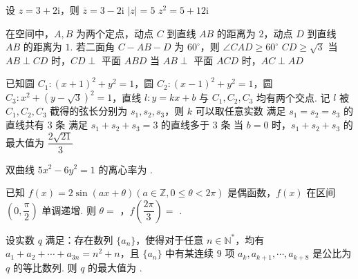 \documentclass[a4paper,11pt]{report}
\begin{document}
\begin{examquestions}[start=9]
\item 设 $z=3+2\mathrm{i}$，则
\fourchoices
{$\overline z=3-2\mathrm{i}$}
{$|z|=5$}
{$z^2=5+12\mathrm{i}$}
{}

\item 在空间中，$A,B$ 为两个定点，动点 $C$ 到直线 $AB$ 的距离为 $2$，动点 $D$ 到直线 $AB$ 的距离为 $1$. 若二面角 $C-AB-D$ 为 $60^\circ$，则
\twochoices
{$\angle CAD\geq 60^\circ$}
{$CD\geq \sqrt3$}
{当 $AB\perp CD$ 时，$CD\perp$ 平面 $ABD$}
{当 $AB\perp$ 平面 $ACD$ 时，$AC\perp AD$}

\item 已知圆 $C_1:(x+1)^2+y^2=1$，圆 $C_2:(x-1)^2+y^2=1$，圆 $C_3:x^2+(y-\sqrt3)^2=1$，直线 $l:y=kx+b$ 与 $C_1,C_2,C_3$ 均有两个交点. 记 $l$ 被 $C_1,C_2,C_3$ 截得的弦长分别为 $s_1,s_2,s_3$，则
\onechoices
{$k$ 可以取任意实数}
{满足 $s_1=s_2=s_3$ 的直线共有 $3$ 条}
{满足 $s_1+s_2+s_3=3$ 的直线多于 $3$ 条}
{当 $b=0$ 时，$s_1+s_2+s_3$ 的最大值为 $\dfrac{2\sqrt{21}}{3}$}
\end{examquestions}

\begin{examquestions}[start=12]
\item 双曲线 $5x^2-6y^2=1$ 的离心率为 \blank.

\item 已知 $f(x)=2\sin(ax+\theta)(a\in\mathbb Z,0\leq\theta<2\pi)$ 是偶函数，$f(x)$ 在区间 $\left(0,\dfrac{\pi}{2}\right)$ 单调递增. 则 $\theta=$ \blank，$f\left(\dfrac{2\pi}{3}\right)=$ \blank.

\item 设实数 $q$ 满足：存在数列 $\{a_n\}$，使得对于任意 $n\in\mathbb N^*$，均有 $a_1+a_2+\cdots+a_{3n}=n^2+n$，且 $\{a_n\}$ 中有某连续 $9$ 项 $a_k,a_{k+1},\cdots,a_{k+8}$ 是公比为 $q$ 的等比数列. 则 $q$ 的最大值为 \blank.
\end{examquestions}
\end{document}
